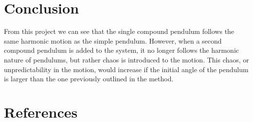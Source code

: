 \documentclass[12pt, a4paper]{article}
\begin{document}
\section{Conclusion}
From this project we can see that the single compound pendulum follows the same harmonic motion as the simple pendulum. However, when a second compound pendulum is added to the system, it no longer follows the harmonic nature of pendulums, but rather chaos is introduced to the motion. This chaos, or unpredictability in the motion, would increase if the initial angle of the pendulum is larger than the one previously outlined in the method.

\section{References}
\printbibliography[heading = none]
\end{document}
